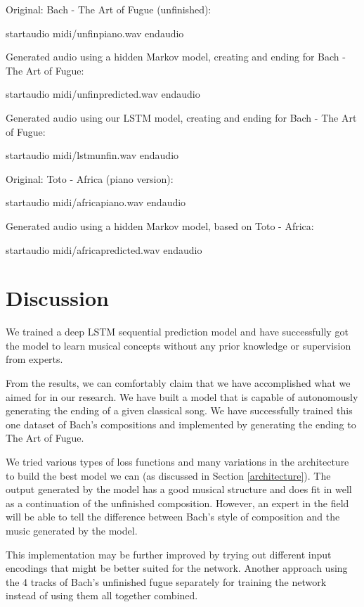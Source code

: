 \documentclass[11pt, twocolumn]{article}
\begin{document}
Original: Bach - The Art of Fugue (unfinished):

startaudio midi/unfinpiano.wav endaudio

Generated audio using a hidden Markov model, creating and ending for Bach - The Art of Fugue:

startaudio midi/unfinpredicted.wav endaudio

Generated audio using our LSTM model, creating and ending for Bach - The Art of Fugue:

startaudio midi/lstmunfin.wav endaudio

Original: Toto - Africa (piano version):

startaudio midi/africapiano.wav endaudio

Generated audio using a hidden Markov model, based on Toto - Africa:

startaudio midi/africapredicted.wav endaudio

\fi

\section{Discussion}
 We trained a deep LSTM sequential prediction model and have successfully got the model to learn musical concepts without any prior knowledge or supervision from experts.

From the results, we can comfortably claim that we have accomplished what we aimed for in our research. We have built a model that is capable of autonomously generating the ending of a given classical song. We have successfully trained this one dataset of Bach's compositions and implemented by generating the ending to The Art of Fugue.

We tried various types of loss functions and many variations in the architecture to build the best model we can (as discussed in Section \ref{architecture}). The output generated by the model has a good musical structure and does fit in well as a continuation of the unfinished composition. However, an expert in the field will be able to tell the difference between Bach's style of composition and the music generated by the model.

This implementation may be further improved by trying out different input encodings that might be better suited for the network. Another approach using the 4 tracks of Bach's unfinished fugue separately for training the network instead of using them all together combined.



\end{document}
